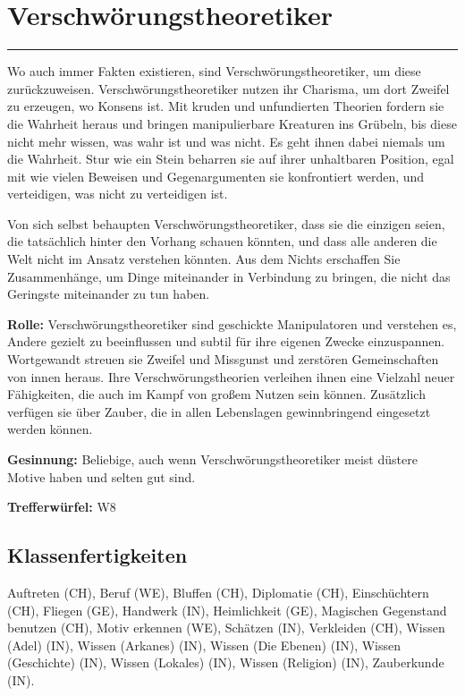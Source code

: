 \documentclass[
	ngerman,
	a4paper,
	11pt,
	twocolumn,
]{scrartcl}
\begin{document}
\section*{Verschwörungstheoretiker}

\rule[2ex]{0.49\textwidth}{1pt}

Wo auch immer Fakten existieren, sind Verschwörungstheoretiker, um diese zurückzuweisen. Verschwörungstheoretiker nutzen ihr Charisma, um dort Zweifel zu erzeugen, wo Konsens ist. Mit kruden und unfundierten Theorien fordern sie die Wahrheit heraus und bringen manipulierbare Kreaturen ins Grübeln, bis diese nicht mehr wissen, was wahr ist und was nicht. Es geht ihnen dabei niemals um die Wahrheit. Stur wie ein Stein beharren sie auf ihrer unhaltbaren Position, egal mit wie vielen Beweisen und Gegenargumenten sie konfrontiert werden, und verteidigen, was nicht zu verteidigen ist.

Von sich selbst behaupten Verschwörungstheoretiker, dass sie die einzigen seien, die tatsächlich hinter den Vorhang schauen könnten, und dass alle anderen die Welt nicht im Ansatz verstehen könnten. Aus dem Nichts erschaffen Sie Zusammenhänge, um Dinge miteinander in Verbindung zu bringen, die nicht das Geringste miteinander zu tun haben.

\textbf{Rolle:} Verschwörungstheoretiker sind geschickte Manipulatoren und verstehen es, Andere gezielt zu beeinflussen und subtil für ihre eigenen Zwecke einzuspannen. Wortgewandt streuen sie Zweifel und Missgunst und zerstören Gemeinschaften von innen heraus. Ihre Verschwörungstheorien verleihen ihnen eine Vielzahl neuer Fähigkeiten, die auch im Kampf von großem Nutzen sein können. Zusätzlich verfügen sie über Zauber, die in allen Lebenslagen gewinnbringend eingesetzt werden können.

\textbf{Gesinnung:} Beliebige, auch wenn Verschwörungstheoretiker meist düstere Motive haben und selten gut sind.

\textbf{Trefferwürfel:} W8

\subsection*{Klassenfertigkeiten}

Auftreten (CH), Beruf (WE), Bluffen (CH), Diplomatie (CH), Einschüchtern (CH), Fliegen (GE), Handwerk (IN), Heimlichkeit (GE), Magischen Gegenstand benutzen (CH), Motiv erkennen (WE), Schätzen (IN), Verkleiden (CH), Wissen (Adel) (IN), Wissen (Arkanes) (IN), Wissen (Die Ebenen) (IN), Wissen (Geschichte) (IN), Wissen (Lokales) (IN), Wissen (Religion) (IN), Zauberkunde (IN).
\end{document}
